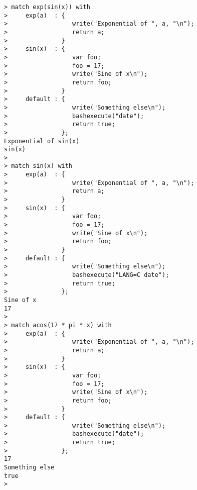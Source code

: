 \begin{center}\begin{minipage}{15cm}\begin{Verbatim}[frame=single]
> match exp(sin(x)) with
>     exp(a)  : { 
>                  write("Exponential of ", a, "\n");
>                  return a;
>               }
>     sin(x)  : {
>                  var foo;
>                  foo = 17;
>                  write("Sine of x\n");
>                  return foo;
>               }
>     default : {
>                  write("Something else\n");
>                  bashexecute("date");
>                  return true;
>               };
Exponential of sin(x)
sin(x)
> 
> match sin(x) with
>     exp(a)  : { 
>                  write("Exponential of ", a, "\n");
>                  return a;
>               }
>     sin(x)  : {
>                  var foo;
>                  foo = 17;
>                  write("Sine of x\n");
>                  return foo;
>               }
>     default : {
>                  write("Something else\n");
>                  bashexecute("LANG=C date");
>                  return true;
>               };
Sine of x
17
> 
> match acos(17 * pi * x) with
>     exp(a)  : { 
>                  write("Exponential of ", a, "\n");
>                  return a;
>               }
>     sin(x)  : {
>                  var foo;
>                  foo = 17;
>                  write("Sine of x\n");
>                  return foo;
>               }
>     default : {
>                  write("Something else\n");
>                  bashexecute("date");
>                  return true;
>               };
17
Something else
true
> 
\end{Verbatim}
\end{minipage}\end{center}

